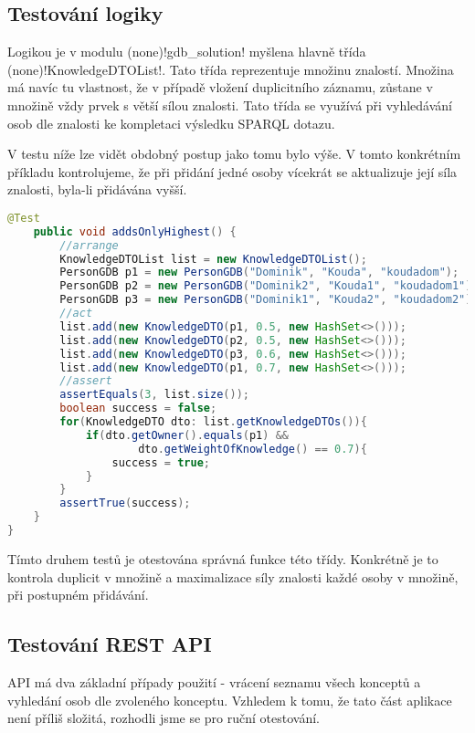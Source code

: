 \subsection{Testování logiky}
Logikou je v modulu \ctulst(none)!gdb_solution! myšlena hlavně třída \ctulst(none)!KnowledgeDTOList!. Tato třída reprezentuje množinu znalostí. Množina má navíc tu vlastnost, že v případě vložení duplicitního záznamu, zůstane v množině vždy prvek s větší sílou znalosti. Tato třída se využívá při vyhledávání osob dle znalosti ke kompletaci výsledku SPARQL dotazu.\par
V testu níže lze vidět obdobný postup jako tomu bylo výše. V tomto konkrétním příkladu kontrolujeme, že při přidání jedné osoby vícekrát se aktualizuje její síla znalosti, byla-li přidávána vyšší.
\begin{lstlisting}[language=JAVA, caption= Jednotkový test aplikační logiky modulu gdb\_solution, captionpos=b]
    @Test
    public void addsOnlyHighest() {
        //arrange
        KnowledgeDTOList list = new KnowledgeDTOList();
        PersonGDB p1 = new PersonGDB("Dominik", "Kouda", "koudadom");
        PersonGDB p2 = new PersonGDB("Dominik2", "Kouda1", "koudadom1");
        PersonGDB p3 = new PersonGDB("Dominik1", "Kouda2", "koudadom2");
        //act
        list.add(new KnowledgeDTO(p1, 0.5, new HashSet<>()));
        list.add(new KnowledgeDTO(p2, 0.5, new HashSet<>()));
        list.add(new KnowledgeDTO(p3, 0.6, new HashSet<>()));
        list.add(new KnowledgeDTO(p1, 0.7, new HashSet<>()));
        //assert
        assertEquals(3, list.size());
        boolean success = false;
        for(KnowledgeDTO dto: list.getKnowledgeDTOs()){
            if(dto.getOwner().equals(p1) && 
                    dto.getWeightOfKnowledge() == 0.7){
                success = true;
            }
        }
        assertTrue(success);
    }
}
\end{lstlisting}
Tímto druhem testů je otestována správná funkce této třídy. Konkrétně je to kontrola duplicit v množině a maximalizace síly znalosti každé osoby v množině, při postupném přidávání.
\subsection{Testování REST API}
API má dva základní případy použití - vrácení seznamu všech konceptů a vyhledání osob dle zvoleného konceptu. Vzhledem k tomu, že tato část aplikace není příliš složitá, rozhodli jsme se pro ruční otestování.\par
